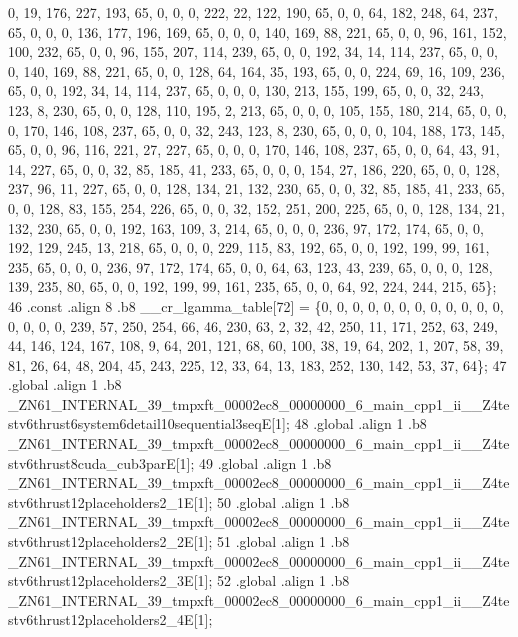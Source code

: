 \begin{DoxyCode}
       0, 19, 176, 227, 193, 65, 0, 0, 0, 222, 22, 122, 190, 65, 0, 0, 64, 182, 248, 64, 237, 65, 0, 0, 0, 136, 177,
       196, 169, 65, 0, 0, 0, 140, 169, 88, 221, 65, 0, 0, 96, 161, 152, 100, 232, 65, 0, 0, 96, 155, 207, 114,
       239, 65, 0, 0, 192, 34, 14, 114, 237, 65, 0, 0, 0, 140, 169, 88, 221, 65, 0, 0, 128, 64, 164, 35, 193, 65, 0,
       0, 224, 69, 16, 109, 236, 65, 0, 0, 192, 34, 14, 114, 237, 65, 0, 0, 0, 130, 213, 155, 199, 65, 0, 0, 32,
       243, 123, 8, 230, 65, 0, 0, 128, 110, 195, 2, 213, 65, 0, 0, 0, 105, 155, 180, 214, 65, 0, 0, 0, 170, 146,
       108, 237, 65, 0, 0, 32, 243, 123, 8, 230, 65, 0, 0, 0, 104, 188, 173, 145, 65, 0, 0, 96, 116, 221, 27, 227, 65,
       0, 0, 0, 170, 146, 108, 237, 65, 0, 0, 64, 43, 91, 14, 227, 65, 0, 0, 32, 85, 185, 41, 233, 65, 0, 0, 0,
       154, 27, 186, 220, 65, 0, 0, 128, 237, 96, 11, 227, 65, 0, 0, 128, 134, 21, 132, 230, 65, 0, 0, 32, 85, 185,
       41, 233, 65, 0, 0, 128, 83, 155, 254, 226, 65, 0, 0, 32, 152, 251, 200, 225, 65, 0, 0, 128, 134, 21, 132,
       230, 65, 0, 0, 192, 163, 109, 3, 214, 65, 0, 0, 0, 236, 97, 172, 174, 65, 0, 0, 192, 129, 245, 13, 218, 65, 0,
       0, 0, 229, 115, 83, 192, 65, 0, 0, 192, 199, 99, 161, 235, 65, 0, 0, 0, 236, 97, 172, 174, 65, 0, 0, 64, 63,
       123, 43, 239, 65, 0, 0, 0, 128, 139, 235, 80, 65, 0, 0, 192, 199, 99, 161, 235, 65, 0, 0, 64, 92, 224, 244,
       215, 65\};
46 .const .align 8 .b8 \_\_cr\_lgamma\_table[72] = \{0, 0, 0, 0, 0, 0, 0, 0, 0, 0, 0, 0, 0, 0, 0, 0, 239, 57, 250,
       254, 66, 46, 230, 63, 2, 32, 42, 250, 11, 171, 252, 63, 249, 44, 146, 124, 167, 108, 9, 64, 201, 121, 68,
       60, 100, 38, 19, 64, 202, 1, 207, 58, 39, 81, 26, 64, 48, 204, 45, 243, 225, 12, 33, 64, 13, 183, 252, 130,
       142, 53, 37, 64\};
47 .global .align 1 .b8
       \_ZN61\_INTERNAL\_39\_tmpxft\_00002ec8\_00000000\_6\_main\_cpp1\_ii\_\_Z4testv6thrust6system6detail10sequential3seqE[1];
48 .global .align 1 .b8
       \_ZN61\_INTERNAL\_39\_tmpxft\_00002ec8\_00000000\_6\_main\_cpp1\_ii\_\_Z4testv6thrust8cuda\_cub3parE[1];
49 .global .align 1 .b8
       \_ZN61\_INTERNAL\_39\_tmpxft\_00002ec8\_00000000\_6\_main\_cpp1\_ii\_\_Z4testv6thrust12placeholders2\_1E[1];
50 .global .align 1 .b8
       \_ZN61\_INTERNAL\_39\_tmpxft\_00002ec8\_00000000\_6\_main\_cpp1\_ii\_\_Z4testv6thrust12placeholders2\_2E[1];
51 .global .align 1 .b8
       \_ZN61\_INTERNAL\_39\_tmpxft\_00002ec8\_00000000\_6\_main\_cpp1\_ii\_\_Z4testv6thrust12placeholders2\_3E[1];
52 .global .align 1 .b8
       \_ZN61\_INTERNAL\_39\_tmpxft\_00002ec8\_00000000\_6\_main\_cpp1\_ii\_\_Z4testv6thrust12placeholders2\_4E[1];

\end{DoxyCode}
